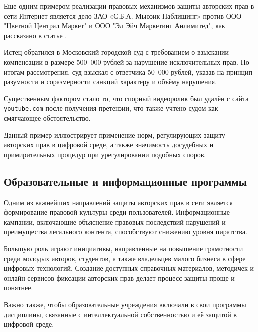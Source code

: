 Еще одним примером реализации правовых механизмов защиты авторских прав в сети
Интернет является дело ЗАО «С.Б.А. Мьюзик Паблишинг» против ООО "Цветной Централ Маркет"
и ООО "Эл Эйч Маркетинг Анлимитед", как рассказано в статье \cite{Zavgorodnyaya2018}.

Истец обратился в Московский городской суд с требованием о взыскании компенсации в
размере 500~000 рублей за нарушение исключительных прав. По итогам рассмотрения, суд
взыскал с ответчика 50~000 рублей, указав на принцип разумности и соразмерности санкций
характеру и объёму нарушения.

Существенным фактором стало то, что спорный видеоролик был удалён с сайта
\texttt{youtube.com} после получения претензии, что также учтено судом как смягчающее
обстоятельство.

Данный пример иллюстрирует применение норм, регулирующих защиту авторских прав в цифровой
среде, а также значимость досудебных и примирительных процедур при урегулировании
подобных споров.

\subsection{Образовательные и информационные программы}

Одним из важнейших направлений защиты авторских прав в сети является формирование
правовой культуры среди пользователей. Информационные кампании, включающие объяснение
правовых последствий нарушений и преимущества легального контента, способствуют снижению
уровня пиратства.

Большую роль играют инициативы, направленные на повышение грамотности среди молодых
авторов, студентов, а также владельцев малого бизнеса в сфере цифровых технологий.
Создание доступных справочных материалов, методичек и онлайн-сервисов фиксации авторских
прав делает процесс защиты проще и понятнее.

Важно также, чтобы образовательные учреждения включали в свои программы дисциплины,
связанные с интеллектуальной собственностью и её защитой в цифровой среде.
